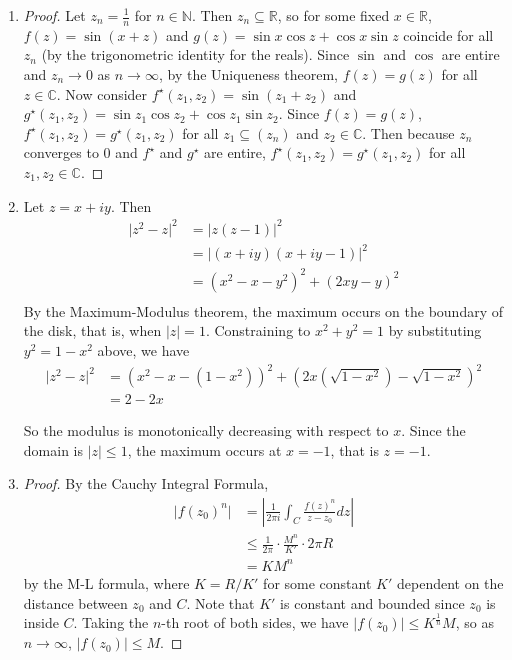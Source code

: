 \documentclass[11pt, letterpaper]{article}
\begin{document}
\begin{enumerate}
  \item \begin{proof}
    Let $z_n = \frac{1}{n}$ for $n \in \mathbb N$. Then $z_n \subseteq \mathbb R$, so for some fixed $x \in \mathbb R$,
    $f(z) = \sin(x + z)$ and  $g(z) = \sin x \cos z + \cos x \sin z$ coincide for all $z_n$ (by the trigonometric identity for the reals). Since $\sin$ and $\cos$ are entire and $z_n \to 0$ as $n \to \infty$, by the Uniqueness theorem, $f(z) = g(z)$ for all $z \in \mathbb C$. Now consider $f^\star(z_1, z_2) = \sin(z_1 + z_2)$ and $g^\star(z_1, z_2) = \sin z_1 \cos z_2 + \cos z_1 \sin z_2$. Since $f(z) = g(z)$, $f^\star(z_1, z_2) = g^\star(z_1, z_2)$ for all $z_1 \subseteq (z_n)$ and $z_2 \in \mathbb C$. Then because $z_n$ converges to 0 and $f^\star$ and $g^\star$ are entire, $f^\star(z_1, z_2) = g^\star(z_1, z_2)$ for all $z_1, z_2 \in \mathbb C$.
  \end{proof}

  \item Let $z = x + iy$. Then
  \begin{align*}
    \vert z^2 - z \vert^2
    &= \vert z(z - 1) \vert^2 \\
    &= \vert (x + iy)(x + iy - 1) \vert^2 \\
    &= (x^2 - x - y^2)^2 + (2xy - y)^2 \\
  \end{align*}
  By the Maximum-Modulus theorem, the maximum occurs on the boundary of the disk, that is, when $\vert z \vert = 1$. Constraining to $x^2 + y^2 = 1$ by substituting $y^2 = 1 - x^2$ above, we have
  \begin{align*}
    \vert z^2 - z \vert^2 &= (x^2 - x - (1 - x^2))^2 + (2x(\sqrt{1 - x^2}) - \sqrt{1 - x^2})^2 \\
    &= 2 - 2x
  \end{align*}

  So the modulus is monotonically decreasing with respect to $x$. Since the domain is $\vert z \vert \leq 1$, the maximum occurs at $x = -1$, that is $z = -1$.

  \item \begin{proof}
    By the Cauchy Integral Formula, \begin{align*}
      \vert f(z_0)^n \vert 
      &= \left\vert \frac{1}{2\pi i} \int_C \frac{f(z)^n}{z - z_0} dz \right\vert \\
      &\leq \frac{1}{2\pi} \cdot \frac {M^n}{K'} \cdot 2 \pi R \\
      &= KM^n
    \end{align*}
    by the M-L formula, where $K = R/K'$ for some constant $K'$ dependent on the distance between $z_0$ and $C$. Note that $K'$ is constant and bounded since $z_0$ is inside $C$. Taking the $n$-th root of both sides, we have $\vert f(z_0) \vert \leq K^{\frac{1}{n}} M$, so as $n \to \infty$, $\vert f(z_0) \vert \leq M$.
  \end{proof}
\end{enumerate}
\end{document}
